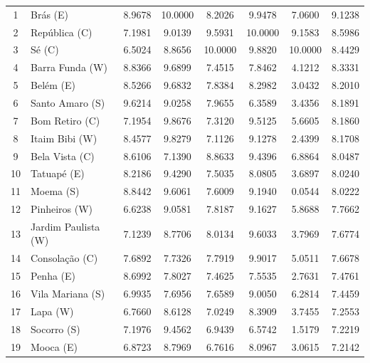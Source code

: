 \documentclass[12pt]{article}
\begin{document}
\begin{longtable}[c]{c|lccccc|c}
1   & Brás               (E) & 8.9678   & 10.0000  & 8.2026   & 9.9478   & 7.0600   & 9.1238  \\
2   & República          (C) & 7.1981   & 9.0139   & 9.5931   & 10.0000  & 9.1583   & 8.5986  \\
3   & Sé                 (C) & 6.5024   & 8.8656   & 10.0000  & 9.8820   & 10.0000  & 8.4429  \\
4   & Barra Funda        (W) & 8.8366   & 9.6899   & 7.4515   & 7.8462   & 4.1212   & 8.3331  \\
5   & Belém              (E) & 8.5266   & 9.6832   & 7.8384   & 8.2982   & 3.0432   & 8.2010  \\
6   & Santo Amaro        (S) & 9.6214   & 9.0258   & 7.9655   & 6.3589   & 3.4356   & 8.1891  \\
7   & Bom Retiro         (C) & 7.1954   & 9.8676   & 7.3120   & 9.5125   & 5.6605   & 8.1860  \\
8   & Itaim Bibi         (W) & 8.4577   & 9.8279   & 7.1126   & 9.1278   & 2.4399   & 8.1708  \\
9   & Bela Vista         (C) & 8.6106   & 7.1390   & 8.8633   & 9.4396   & 6.8864   & 8.0487  \\
10  & Tatuapé            (E) & 8.2186   & 9.4290   & 7.5035   & 8.0805   & 3.6897   & 8.0240  \\
11  & Moema              (S) & 8.8442   & 9.6061   & 7.6009   & 9.1940   & 0.0544   & 8.0222  \\
12  & Pinheiros          (W) & 6.6238   & 9.0581   & 7.8187   & 9.1627   & 5.8688   & 7.7662  \\
13  & Jardim Paulista    (W) & 7.1239   & 8.7706   & 8.0134   & 9.6033   & 3.7969   & 7.6774  \\
14  & Consolação         (C) & 7.6892   & 7.7326   & 7.7919   & 9.9017   & 5.0511   & 7.6678  \\
15  & Penha              (E) & 8.6992   & 7.8027   & 7.4625   & 7.5535   & 2.7631   & 7.4761  \\
16  & Vila Mariana       (S) & 6.9935   & 7.6956   & 7.6589   & 9.0050   & 6.2814   & 7.4459  \\
17  & Lapa               (W) & 6.7660   & 8.6128   & 7.0249   & 8.3909   & 3.7455   & 7.2553  \\
18  & Socorro            (S) & 7.1976   & 9.4562   & 6.9439   & 6.5742   & 1.5179   & 7.2219  \\
19  & Mooca              (E) & 6.8723   & 8.7969   & 6.7616   & 8.0967   & 3.0615   & 7.2142  \\

\end{longtable}
\end{document}
